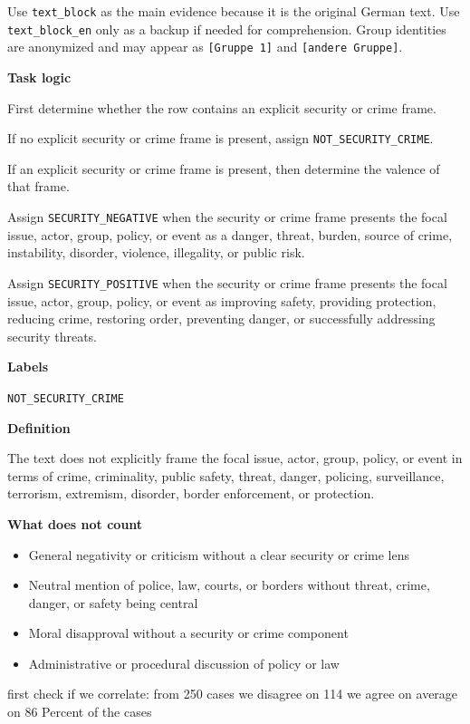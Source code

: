 \documentclass[11pt,titlepage,oneside,openany]{article}
\begin{document}
\begin{itemize}
\begin{instructionbox}
Use \texttt{text\_block} as the main evidence because it is the original German text. Use \texttt{text\_block\_en} only as a backup if needed for comprehension. Group identities are anonymized and may appear as \texttt{[Gruppe 1]} and \texttt{[andere Gruppe]}.

\medskip
\textbf{Task logic}

First determine whether the row contains an explicit security or crime frame.

If no explicit security or crime frame is present, assign \texttt{NOT\_SECURITY\_CRIME}.

If an explicit security or crime frame is present, then determine the valence of that frame.

Assign \texttt{SECURITY\_NEGATIVE} when the security or crime frame presents the focal issue, actor, group, policy, or event as a danger, threat, burden, source of crime, instability, disorder, violence, illegality, or public risk.

Assign \texttt{SECURITY\_POSITIVE} when the security or crime frame presents the focal issue, actor, group, policy, or event as improving safety, providing protection, reducing crime, restoring order, preventing danger, or successfully addressing security threats.

\medskip
\textbf{Labels}

\texttt{NOT\_SECURITY\_CRIME}

\textbf{Definition}

The text does not explicitly frame the focal issue, actor, group, policy, or event in terms of crime, criminality, public safety, threat, danger, policing, surveillance, terrorism, extremism, disorder, border enforcement, or protection.

\textbf{What does not count}
\begin{itemize}[leftmargin=*,nosep]
  \item General negativity or criticism without a clear security or crime lens
  \item Neutral mention of police, law, courts, or borders without threat, crime, danger, or safety being central
  \item Moral disapproval without a security or crime component
  \item Administrative or procedural discussion of policy or law
\end{itemize}

first check if we correlate: from 250 cases we disagree on 114
we agree on average on 86 Percent of the cases 
\end{instructionbox}





\end{itemize}
\end{document}
